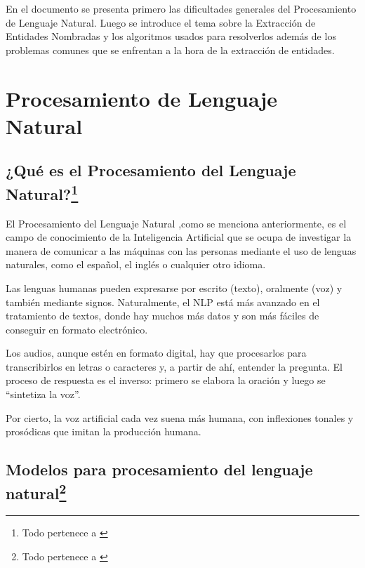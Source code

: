 \documentclass[runningheads]{llncs}
\begin{document}
En el documento se presenta primero las dificultades generales del Procesamiento de Lenguaje Natural. Luego se introduce el tema sobre la Extracción de Entidades Nombradas y los algoritmos usados para resolverlos además de los problemas comunes que se enfrentan a la hora de la extracción de entidades.

\section{Procesamiento de Lenguaje Natural}

\subsection{¿Qué es el Procesamiento del Lenguaje Natural?\protect\footnote{Todo pertenece a \cite{nlp}}}
El Procesamiento del Lenguaje Natural ,como se menciona anteriormente, es el campo de conocimiento de la Inteligencia Artificial que se ocupa de investigar la manera de comunicar a las máquinas con las personas mediante el uso de lenguas naturales, como el español, el inglés o cualquier 
otro idioma.

Las lenguas humanas pueden expresarse por escrito (texto), oralmente (voz) y también mediante signos. Naturalmente, el NLP está más avanzado en el tratamiento de textos, donde hay muchos más datos y son más fáciles de conseguir en formato electrónico.

Los audios, aunque estén en formato digital, hay que procesarlos para transcribirlos en letras o caracteres y, a partir de ahí, entender la pregunta. El proceso de respuesta es el inverso: primero se elabora la oración y luego se “sintetiza la voz”.

Por cierto, la voz artificial cada vez suena más humana, con inflexiones tonales y prosódicas que imitan la producción humana.



\subsection{Modelos para procesamiento del lenguaje natural\protect\footnote{Todo pertenece a \cite{nlp}}}
\end{document}
